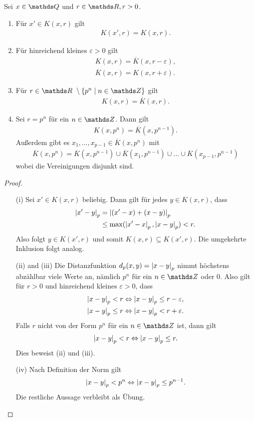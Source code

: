\begin{satz}
Sei $x\in \Q$ und $r \in \R, r>0$.
\begin{enumerate}[label=(\roman*)]
\item Für $x'\in K(x,r)$ gilt
\begin{align*}
K(x',r)=K(x,r).
\end{align*}
\item Für hinreichend kleines $\varepsilon>0$ gilt
\begin{align*}
K(x,r)=\overline{K}(x,r-\varepsilon),\\
\overline{K}(x,r)=K(x,r+\varepsilon).
\end{align*}
\item Für $r\in \R\ \setminus \{p^n \mid n\in \Z\}$ gilt
\begin{align*}
K(x,r)=\overline{K}(x,r).
\end{align*}
\item Sei $r=p^n$ für ein $n\in \Z$. Dann gilt
\begin{align*}
K(x,p^n)=\overline{K}(x,p^{n-1}).
\end{align*}
Außerdem gibt es $x_1,\dots,x_{p-1}\in \overline{K}(x,p^n)$ mit
\begin{align*}
\overline{K}(x,p^n)=\overline{K}(x,p^{n-1})\cup \overline{K}(x_1,p^{n-1})\cup \dots \cup \overline{K}(x_{p-1},p^{n-1})
\end{align*}
wobei die Vereinigungen disjunkt sind.
\end{enumerate}
\begin{proof}
\begin{enumerate}
\item[(i)] Sei $x'\in K(x,r)$ beliebig.
Dann gilt für jedes $y\in K(x,r)$, dass 
\begin{align*}
\left\vert x'-y\right\vert_p&=\left\vert(x'-x)+(x-y)\right\vert_p\\
&\leq \max(\left\vert x'-x\right\vert_p,\left\vert x-y\right\vert_p)<r.
\end{align*}
Also folgt $y\in K(x',r)$ und somit $K(x,r)\subseteq K(x',r)$.
Die umgekehrte Inklusion folgt analog.
\item[(ii) and (iii)] Die Distanzfunktion $d_p(x,y)=\left\vert x-y\right\vert_p$ nimmt höchstens abzählbar viele Werte an, nämlich $p^n$ für ein $n\in \Z$ oder $0$.
Also gilt für $r>0$ und hinreichend kleines $\varepsilon>0$, dass
\begin{align*}
\left\vert x-y\right\vert_p<r \Leftrightarrow \left\vert x-y\right\vert_p \leq r-\varepsilon,\\
\left\vert x-y\right\vert_p \leq r \Leftrightarrow \left\vert x-y\right\vert_p<r+\varepsilon.
\end{align*}
Falls $r$ nicht von der Form $p^n$ für ein $n\in \Z$ ist, dann gilt
\begin{align*}
\left\vert x-y\right\vert_p<r \Leftrightarrow \left\vert x-y\right\vert_p\leq r.
\end{align*}
Dies beweist (ii) und (iii).
\item[(iv)] Nach Definition der Norm gilt
\begin{align*}
\left\vert x-y\right\vert_p<p^n \Leftrightarrow \left\vert x-y\right\vert_p\leq p^{n-1}.
\end{align*}
Die restliche Aussage verbleibt als Übung.
\qedhere
\end{enumerate}
\end{proof}
\end{satz}

